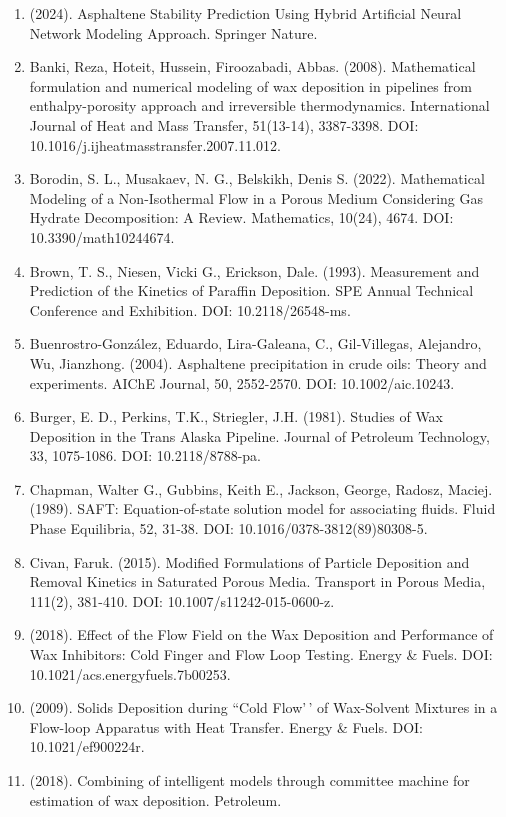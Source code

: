 \documentclass[11pt]{extarticle}
\begin{document}
\begin{enumerate}
\item
  (2024). Asphaltene Stability Prediction Using Hybrid Artificial Neural Network Modeling Approach. Springer Nature.
\item
  Banki, Reza, Hoteit, Hussein, Firoozabadi, Abbas. (2008). Mathematical formulation and numerical modeling of wax deposition in pipelines from enthalpy-porosity approach and irreversible thermodynamics. International Journal of Heat and Mass Transfer, 51(13-14), 3387-3398. DOI: 10.1016/j.ijheatmasstransfer.2007.11.012.
\item
  Borodin, S. L., Musakaev, N. G., Belskikh, Denis S. (2022). Mathematical Modeling of a Non-Isothermal Flow in a Porous Medium Considering Gas Hydrate Decomposition: A Review. Mathematics, 10(24), 4674. DOI: 10.3390/math10244674.
\item
  Brown, T. S., Niesen, Vicki G., Erickson, Dale. (1993). Measurement and Prediction of the Kinetics of Paraffin Deposition. SPE Annual Technical Conference and Exhibition. DOI: 10.2118/26548-ms.
\item
  Buenrostro-González, Eduardo, Lira-Galeana, C., Gil‐Villegas, Alejandro, Wu, Jianzhong. (2004). Asphaltene precipitation in crude oils: Theory and experiments. AIChE Journal, 50, 2552-2570. DOI: 10.1002/aic.10243.
\item
  Burger, E. D., Perkins, T.K., Striegler, J.H. (1981). Studies of Wax Deposition in the Trans Alaska Pipeline. Journal of Petroleum Technology, 33, 1075-1086. DOI: 10.2118/8788-pa.
\item
  Chapman, Walter G., Gubbins, Keith E., Jackson, George, Radosz, Maciej. (1989). SAFT: Equation-of-state solution model for associating fluids. Fluid Phase Equilibria, 52, 31-38. DOI: 10.1016/0378-3812(89)80308-5.
\item
  Civan, Faruk. (2015). Modified Formulations of Particle Deposition and Removal Kinetics in Saturated Porous Media. Transport in Porous Media, 111(2), 381-410. DOI: 10.1007/s11242-015-0600-z.
\item
  (2018). Effect of the Flow Field on the Wax Deposition and Performance of Wax Inhibitors: Cold Finger and Flow Loop Testing. Energy \& Fuels. DOI: 10.1021/acs.energyfuels.7b00253.
\item
  (2009). Solids Deposition during ``Cold Flow'\,' of Wax-Solvent Mixtures in a Flow-loop Apparatus with Heat Transfer. Energy \& Fuels. DOI: 10.1021/ef900224r.
\item
  (2018). Combining of intelligent models through committee machine for estimation of wax deposition. Petroleum.

\end{enumerate}
\end{document}
